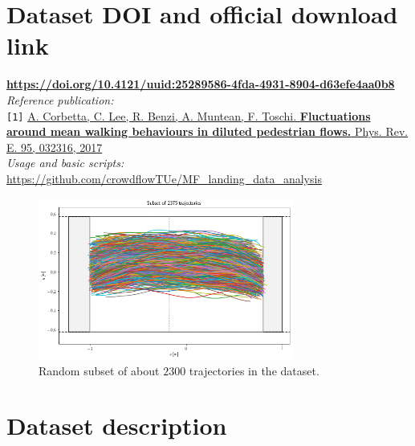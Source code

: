 \documentclass[12pt]{article}
\begin{document}
\date{2017}
\maketitle


\section{Dataset DOI and official download link}

\textbf{\url{https://doi.org/10.4121/uuid:25289586-4fda-4931-8904-d63efe4aa0b8}}\\


\noindent \textit{Reference publication:}\\
\verb|[1]| \href{http://journals.aps.org/pre/abstract/10.1103/PhysRevE.95.032316}{A. Corbetta, C. Lee, R. Benzi, A. Muntean, F. Toschi. \textbf{Fluctuations around mean walking behaviours in diluted pedestrian flows.} Phys. Rev. E. 95, 032316, 2017}\\

\noindent \textit{Usage and basic scripts:}\\
\url{https://github.com/crowdflowTUe/MF_landing_data_analysis}




\begin{figure}[h]

  \centering
  \includegraphics[width=0.75\textwidth, trim={0cm 0 0 .7cm },clip]{traj_portrait.png}
    \caption{Random subset of about $2300$ trajectories in the dataset.\label{fig}}
\end{figure}




\section{Dataset description}
\end{document}
